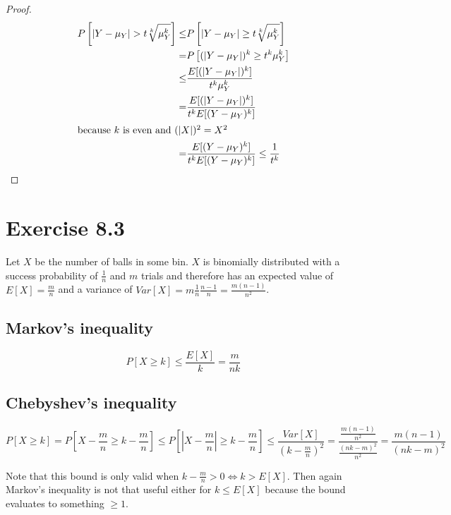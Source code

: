 \documentclass[10pt,a4paper]{article}
\begin{document}
\begin{proof}
  \begin{align*}
    P\left[ |Y - \mu_{Y}| > t \sqrt[k]{\mu_{Y}^{k}} \right] \le & P\left[ |Y - \mu_{Y}| \ge t \sqrt[k]{\mu_{Y}^{k}} \right]\\
    = & P\left[ (|Y - \mu_{Y}|)^{k} \ge t^{k}\mu_{Y}^{k} \right]\\
    \le & \frac{E[(|Y - \mu_{Y}|)^{k}]}{t^{k}\mu_{Y}^{k}}\\
    = & \frac{E[(|Y - \mu_{Y}|)^{k}]}{t^{k} E[(Y - \mu_{Y})^{k}]}\\
    \intertext{because $k$ is even and $(|X|)^{2} = X^{2}$}
    = & \frac{E[(Y - \mu_{Y})^{k}]}{t^{k} E[(Y - \mu_{Y})^{k}]} \le \frac{1}{t^{k}}
  \end{align*}
\end{proof}

\section*{Exercise 8.3}

Let $X$ be the number of balls in some bin.
$X$ is binomially distributed with a success probability of $\frac{1}{n}$ and $m$ trials and therefore has an expected value of $E[X] = \frac{m}{n}$ and a variance of $Var[X] = m \frac{1}{n}\frac{n - 1}{n} = \frac{m(n - 1)}{n^{2}}$.

\subsection*{Markov's inequality}

\begin{equation*}
  P[X \ge k] \le \frac{E[X]}{k} = \frac{m}{nk}
\end{equation*}

\subsection*{Chebyshev's inequality}

\begin{equation*}
  P\left[ X \ge k \right] = P\left[ X - \frac{m}{n} \ge k - \frac{m}{n} \right] \le P\left[ |X - \frac{m}{n}| \ge k - \frac{m}{n} \right] \le \frac{Var[X]}{\left( k - \frac{m}{n} \right)^{2}} = \frac{\frac{m(n - 1)}{n^{2}}}{\frac{(nk - m)^{2}}{n^{2}}} = \frac{m(n - 1)}{(nk - m)^{2}}
\end{equation*}

Note that this bound is only valid when $k - \frac{m}{n} > 0 \Leftrightarrow k > E[X]$.
Then again Markov's inequality is not that useful either for $k \le E[X]$ because the bound evaluates to something $\ge 1$.
\end{document}
